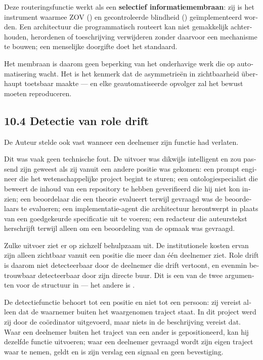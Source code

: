 \begin{dutch}
Deze routeringsfunctie werkt als een \textbf{selectief informatiemembraan}: zij is het instrument waarmee ZOV () en gecontroleerde blindheid () geïmplementeerd worden. Een architectuur die programmatisch routeert kan niet gemakkelijk achterhouden, herordenen of toeschrijving verwijderen zonder daarvoor een mechanisme te bouwen; een menselijke doorgifte doet het standaard.

Het membraan is daarom geen beperking van het onderhavige werk die op automatisering wacht. Het is het kenmerk dat de asymmetrieën in zichtbaarheid überhaupt toetsbaar maakte — en elke geautomatiseerde opvolger zal het bewust moeten reproduceren.


\subsection*{10.4 Detectie van role drift}
\label{sec:nl:10.4}

De Auteur stelde ook vast wanneer een deelnemer zijn functie had verlaten.

Dit was vaak geen technische fout. De uitvoer was dikwijls intelligent en zou passend zijn geweest als zij vanuit een andere positie was gekomen: een prompt engineer die het wetenschappelijke project begint te sturen; een ontologiespecialist die beweert de inhoud van een repository te hebben geverifieerd die hij niet kon inzien; een beoordelaar die een theorie evalueert terwijl gevraagd was de beoordelaars te evalueren; een implementatie-agent die architectuur herontwerpt in plaats van een goedgekeurde specificatie uit te voeren; een redacteur die auteurstekst herschrijft terwijl alleen om een beoordeling van de opmaak was gevraagd.

Zulke uitvoer ziet er op zichzelf behulpzaam uit. De institutionele kosten ervan zijn alleen zichtbaar vanuit een positie die meer dan één deelnemer ziet. Role drift is daarom niet detecteerbaar door de deelnemer die drift vertoont, en evenmin betrouwbaar detecteerbaar door zijn directe buur. Dit is een van de twee argumenten voor de structuur in  — het andere is .

De detectiefunctie behoort tot een positie en niet tot een persoon: zij vereist alleen dat de waarnemer buiten het waargenomen traject staat. In dit project werd zij door de coördinator uitgevoerd, maar niets in de beschrijving vereist dat. Waar een deelnemer buiten het traject van een ander is gepositioneerd, kan hij dezelfde functie uitvoeren; waar een deelnemer gevraagd wordt zijn eigen traject waar te nemen, geldt  en is zijn verslag een signaal en geen bevestiging.



\end{dutch}
